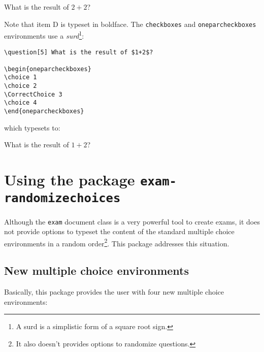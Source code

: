 \documentclass[12pt,a4paper]{exam}
\begin{document}
\printanswers

\begin{questions}
\setcounter{question}{4}
\question[5] What is the result of $2+2$?

\begin{choices}
\end{choices}
\end{questions}

Note that item D is typeset in boldface. The \texttt{checkboxes} and \texttt{oneparcheckboxes}
environments use a \emph{surd}\footnote{A surd is a simplistic form of a square root sign.}:

\begin{lstlisting}
\question[5] What is the result of $1+2$?

\begin{oneparcheckboxes}
\choice 1
\choice 2
\CorrectChoice 3
\choice 4
\end{oneparcheckboxes}
\end{lstlisting}

which typesets to:

\begin{questions}
\setcounter{question}{5}
\question[5] What is the result of $1+2$?

\begin{oneparcheckboxes}
\end{oneparcheckboxes}
\end{questions}

\noprintanswers


\section{Using the package \texttt{exam-randomizechoices}}
Although the \texttt{exam} document class is a very powerful tool to
create exams, it does not provide options to typeset the content of the
standard multiple choice environments in a random order\footnote{It
also doesn't provides options to randomize questions.}. This package
addresses this situation.

\subsection{New multiple choice environments}
Basically, this package provides the user with four new multiple choice
environments:
\end{document}
